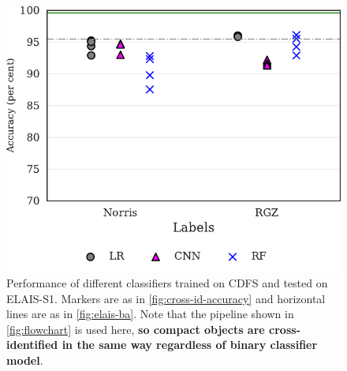 \documentclass[fleqn,usenatbib,usedcolumn]{mnras}
\newcommand{\edited}[1]{{\bf {#1}}}
\begin{document}
  \begin{figure}
    \centering
    \includegraphics[width=0.9\columnwidth]{images/elais_cross_identification_grid.pdf}
    \caption{Performance of different classifiers trained on CDFS and tested
    on ELAIS-S1. Markers are as in \autoref{fig:cross-id-accuracy} and
    horizontal lines are as in \autoref{fig:elais-ba}. Note that the pipeline
    shown in \autoref{fig:flowchart} is used here, \edited{so compact objects
    are cross-identified in the same way regardless of binary classifier
    model}.
      \label{fig:elais-cross-id-accuracy}}
  \end{figure}
\end{document}
